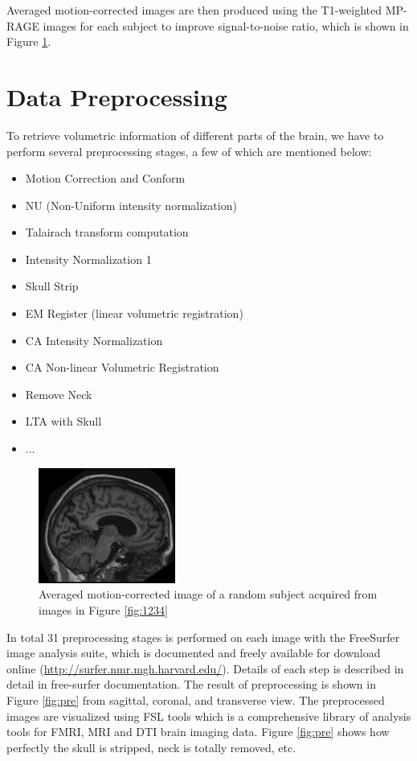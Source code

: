 Averaged motion-corrected images are then produced using the T1-weighted MP-RAGE images for each subject to improve signal-to-noise ratio, which is shown in Figure \ref{fig:avg}.

\section{Data Preprocessing}

To retrieve volumetric information of different parts of the brain, we have to perform several preprocessing stages, a few of which are mentioned below:

\begin{itemize}
	\item Motion Correction and Conform
	\item NU (Non-Uniform intensity normalization)
	\item Talairach transform computation
	\item Intensity Normalization 1
	\item Skull Strip
	\item EM Register (linear volumetric registration)
	\item CA Intensity Normalization
	\item CA Non-linear Volumetric Registration
	\item Remove Neck
	\item LTA with Skull
	\item ...
\end{itemize}

\begin{figure}
	\centering
	\includegraphics[width=0.4\textwidth]{images/avg.png}
	\caption{Averaged motion-corrected image of a random subject acquired from images in Figure \ref{fig:1234}}
	\label{fig:avg}
\end{figure} 

In total 31 preprocessing stages is performed on each image with the FreeSurfer image analysis suite, which is documented and freely available for download online (\href{http://surfer.nmr.mgh.harvard.edu/}{http://surfer.nmr.mgh.harvard.edu/}). Details of each step is described in detail in free-surfer documentation. The result of preprocessing is shown in Figure \ref{fig:pre} from sagittal, coronal, and transverse view. The preprocessed images are visualized using FSL tools which is a comprehensive library of analysis tools for FMRI, MRI and DTI brain imaging data. Figure \ref{fig:pre} shows how perfectly the skull is stripped, neck is totally removed, etc.

